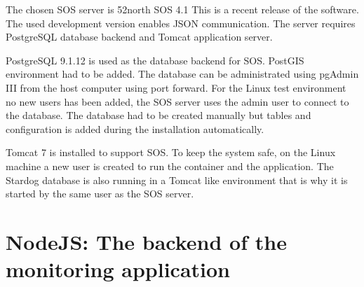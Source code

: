 The chosen SOS server is 52north SOS 4.1 This is a recent release of the software. The used development version enables JSON communication. The server requires PostgreSQL database backend and Tomcat application server.

PostgreSQL 9.1.12 is used as the database backend for SOS. PostGIS environment had to be added. The database can be administrated using pgAdmin III from the host computer using port forward. For the Linux test environment no new users has been added, the SOS server uses the admin user to connect to the database. The database had to be created manually but tables and configuration is added during the installation automatically.

Tomcat 7 is installed to support SOS. To keep the system safe, on the Linux machine a new user is created to run the container and the application. The Stardog database is also running in a Tomcat like environment that is why it is started by the same user as the SOS server. 

\section{NodeJS: The backend of the monitoring application}

